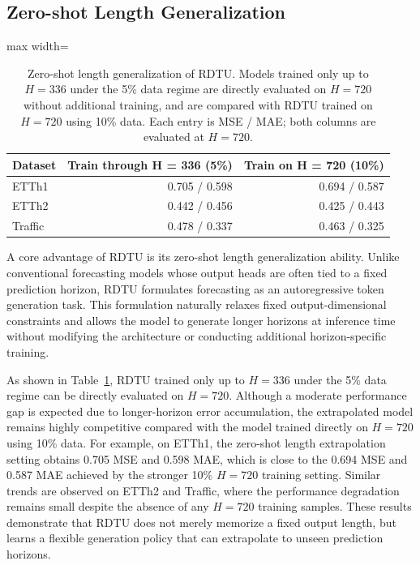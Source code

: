 \subsection{Zero-shot Length Generalization}
\label{sec:length_generalization}

\begin{table}[htbp]\centering\small
\caption{Zero-shot length generalization of RDTU. Models trained only up to $H=336$ under the 5\% data regime are directly evaluated on $H=720$ without additional training, and are compared with RDTU trained on $H=720$ using 10\% data. Each entry is MSE / MAE; both columns are evaluated at $H=720$.}\label{tab:length_generalization}
\setlength{\tabcolsep}{4pt}\renewcommand{\arraystretch}{1.25}
\begin{adjustbox}{max width=\linewidth}\begin{tabular}{lrr}\toprule
\textbf{Dataset} & \textbf{Train through H = 336 (5\%)} & \textbf{Train on H = 720 (10\%)}\\\midrule
ETTh1 & 0.705 / 0.598 & 0.694 / 0.587\\
ETTh2 & 0.442 / 0.456 & 0.425 / 0.443\\
Traffic & 0.478 / 0.337 & 0.463 / 0.325\\
\bottomrule\end{tabular}\end{adjustbox}\end{table}

A core advantage of RDTU is its zero-shot length generalization ability.
Unlike conventional forecasting models whose output heads are often tied to a fixed prediction horizon, RDTU formulates forecasting as an autoregressive token generation task.
This formulation naturally relaxes fixed output-dimensional constraints and allows the model to generate longer horizons at inference time without modifying the architecture or conducting additional horizon-specific training.

As shown in Table~\ref{tab:length_generalization}, RDTU trained only up to $H=336$ under the 5\% data regime can be directly evaluated on $H=720$.
Although a moderate performance gap is expected due to longer-horizon error accumulation, the extrapolated model remains highly competitive compared with the model trained directly on $H=720$ using 10\% data.
For example, on ETTh1, the zero-shot length extrapolation setting obtains 0.705 MSE and 0.598 MAE, which is close to the 0.694 MSE and 0.587 MAE achieved by the stronger 10\% $H=720$ training setting.
Similar trends are observed on ETTh2 and Traffic, where the performance degradation remains small despite the absence of any $H=720$ training samples.
These results demonstrate that RDTU does not merely memorize a fixed output length, but learns a flexible generation policy that can extrapolate to unseen prediction horizons.

